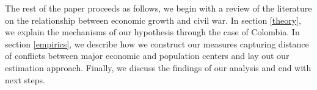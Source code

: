 The rest of the paper proceeds as follows, we begin with a review of the literature on the relationship between economic growth and civil war. In section \ref{theory}, we explain the mechanisms of our hypothesis through the case of Colombia. In section \ref{empirics}, we describe how we construct our measures capturing distance of conflicts between major economic and population centers and lay out our estimation approach. Finally, we discuss the findings of our analysis and end with next steps. 